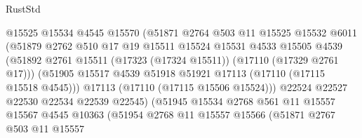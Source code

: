 \begin{lexlean}{RustStd}
\begin{coremodule}
                                @15525
                                @15534
                                @4545
                                @15570
                                (@51871
                                  @2764
                                  @503
                                  @11
                                  @15525
                                  @15532
                                  @6011
                                  (@51879
                                    @2762
                                    @510
                                    @17
                                    @19
                                    @15511
                                    @15524
                                    @15531
                                    @4533
                                    @15505
                                    @4539
                                    (@51892
                                      @2761
                                      @15511
                                      (@17323 (@17324 @15511))
                                      (@17110 (@17329 @2761 @17)))
                                    (@51905
                                      @15517
                                      @4539
                                      @51918
                                      @51921
                                      @17113
                                      (@17110 (@17115 @15518 @4545)))
                                    @17113
                                    (@17110 (@17115 @15506 @15524)))
                                  @22524
                                  @22527
                                  @22530
                                  @22534
                                  @22539
                                  @22545)
                                (@51945
                                  @15534
                                  @2768
                                  @561
                                  @11
                                  @15557
                                  @15567
                                  @4545
                                  @10363
                                  (@51954
                                    @2768
                                    @11
                                    @15557
                                    @15566
                                    (@51871
                                      @2767
                                      @503
                                      @11
                                      @15557

\end{coremodule}
\end{lexlean}
